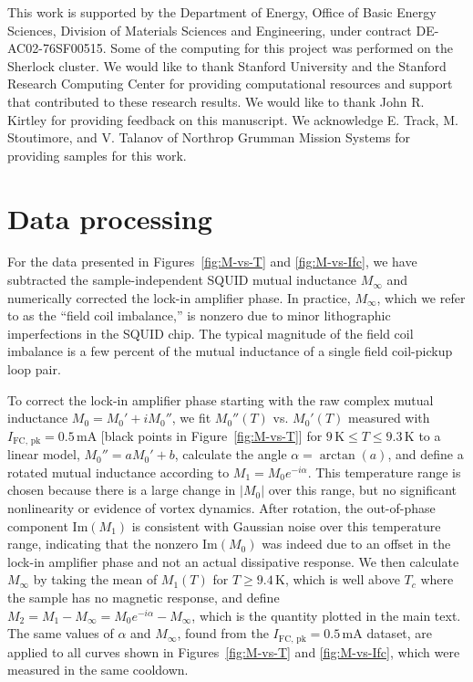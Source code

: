\documentclass[%
 reprint,
 superscriptaddress,
 amsmath,
 amssymb,
 amsfonts,
 aps,
 prb,
]{revtex4-2}
\newcommand{\Tc}{T_c}
\newcommand{\FC}{\mathrm{FC}}
\newcommand{\pk}{\mathrm{pk}}
\newcommand{\mA}{\mathrm{mA}}
\renewcommand{\Im}{\mathrm{Im}}
\begin{document}
\begin{acknowledgments}
This work is supported by the Department of Energy, Office of Basic Energy Sciences, Division of Materials Sciences and Engineering, under contract DE-AC02-76SF00515. Some of the computing for this project was performed on the Sherlock cluster. We would like to thank Stanford University and the Stanford Research Computing Center for providing computational resources and support that contributed to these research results. We would like to thank John R. Kirtley for providing feedback on this manuscript. We acknowledge E. Track, M. Stoutimore, and V. Talanov of Northrop Grumman Mission Systems for providing samples for this work.
\end{acknowledgments}

\appendix

\section{Data processing}
\label{sec:data-processing}
For the data presented in Figures~\ref{fig:M-vs-T} and \ref{fig:M-vs-Ifc}, we have subtracted the sample-independent SQUID mutual inductance $M_\infty$ and numerically corrected the lock-in amplifier phase. In practice, $M_\infty$, which we refer to as the ``field coil imbalance,'' is nonzero due to minor lithographic imperfections in the SQUID chip. The typical magnitude of the field coil imbalance is a few percent of the mutual inductance of a single field coil-pickup loop pair.

To correct the lock-in amplifier phase starting with the raw complex mutual inductance $M_0=M_0'+iM_0''$, we fit $M_0''(T)$ vs. $M_0'(T)$ measured with $I_{\FC,\,\pk}=0.5\,\mA$ [black points in Figure~\ref{fig:M-vs-T}] for $9\,\mathrm{K}\leq T\leq 9.3\,\mathrm{K}$ to a linear model, $M_0''=aM_0' + b$, calculate the angle $\alpha=\arctan(a)$, and define a rotated mutual inductance according to $M_1=M_0e^{-i\alpha}$. This temperature range is chosen because there is a large change in $|M_0|$ over this range, but no significant nonlinearity or evidence of vortex dynamics. After rotation, the out-of-phase component $\Im(M_1)$ is consistent with Gaussian noise over this temperature range, indicating that the nonzero $\mathrm{Im}(M_0)$ was indeed due to an offset in the lock-in amplifier phase and not an actual dissipative response. We then calculate $M_\infty$ by taking the mean of $M_1(T)$ for $T\geq 9.4\,\mathrm{K}$, which is well above $\Tc$ where the sample has no magnetic response, and define $M_2=M_1-M_\infty=M_0e^{-i\alpha}-M_\infty$, which is the quantity plotted in the main text.
The same values of $\alpha$ and $M_\infty$, found from the $I_{\FC,\,\pk}=0.5\,\mA$ dataset, are applied to all curves shown in Figures~\ref{fig:M-vs-T} and \ref{fig:M-vs-Ifc}, which were measured in the same cooldown.
\end{document}
